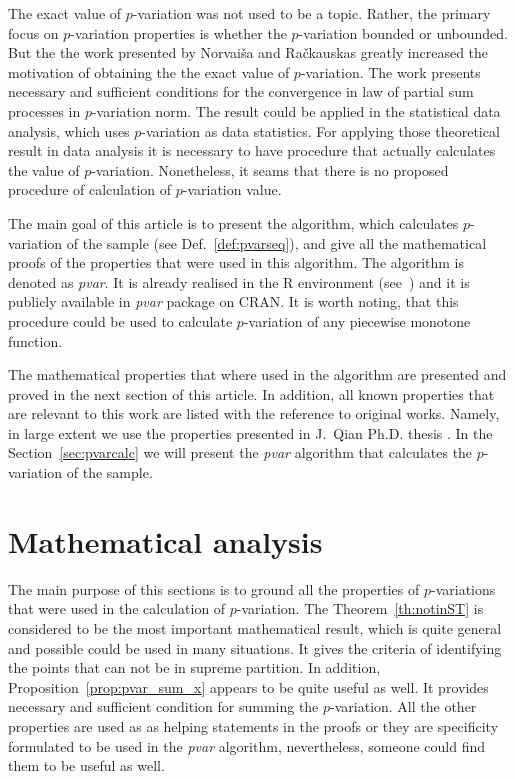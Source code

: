 \documentclass[12pt, a4paper]{article}
\numberwithin{equation}{section}
\begin{document}
  
The exact value of $p$-variation was not used to be a topic.
Rather, the primary focus on $p$-variation properties 
is whether the $p$-variation bounded or unbounded. 
But the the work \cite{NorvaisaRackauskas2008} presented by
Norvaiša and Račkauskas greatly increased the motivation
of obtaining the the exact value of $p$-variation.
The work \cite{NorvaisaRackauskas2008} presents
necessary and sufficient conditions
for the convergence in law of partial sum processes in
$p$-variation norm. 
The result could be applied in the statistical data analysis,
which uses $p$-variation as data statistics.
For applying those theoretical result in data analysis it is necessary
to have procedure that actually calculates the value of $p$-variation.
Nonetheless, it seams that there is no proposed 
procedure of calculation of $p$-variation value.

The main goal of this article is to present the algorithm,
which calculates $p$-variation of the sample
(see Def.~\ref{def:pvarseq}), and give all the mathematical proofs
of the properties that were used in this algorithm.
The algorithm is denoted as \emph{pvar}.
It is already realised in the R environment (see~\cite{R})
and it is publicly available in \emph{pvar} package on CRAN\footnotemark.
It is worth noting, that this procedure could be used to calculate
$p$-variation of any piecewise monotone function.

The mathematical properties that where used in the
algorithm are presented and proved in the next section of this article.
In addition, all known properties that are relevant to this work
are listed with the reference to original works. Namely, in large extent
we use the properties presented in J.~Qian Ph.D. thesis \cite{Qian}\footnotemark.
In the Section~\ref{sec:pvarcalc} we will present the \emph{pvar}
algorithm that calculates the $p$-variation of the sample.



\section{Mathematical analysis}



The main purpose of this sections is to 
ground all the properties of $p$-variations 
that were used in the calculation of $p$-variation.
The Theorem~\ref{th:notinST} is considered to
be the most important mathematical result,
which is quite general and possible could be used
in many situations. It gives the criteria of 
identifying the points that can not be in supreme partition.
In addition, Proposition~\ref{prop:pvar_sum_x}
appears to be quite useful as well. It provides 
necessary and sufficient condition for summing the 
$p$-variation.
All the other properties are used as as helping statements
in the proofs or they are specificity formulated 
to be used in the \emph{pvar} algorithm, nevertheless, 
someone could find them to be useful as well.
\end{document}
